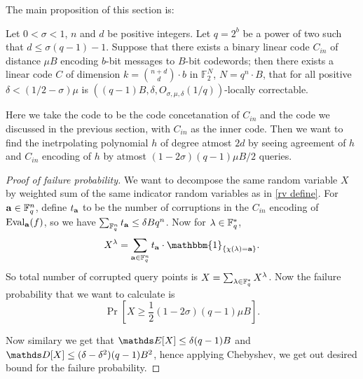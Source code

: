 The main proposition of this section is:

\begin{greybox}
		\begin{proposition}{}{}
			Let $0<\sigma < 1$, $n$ and $d$ be positive integers. Let $q = 2^b$ be a power of two such that $d \leq \sigma(q-1) - 1$. Suppose that there exists a binary linear code $C_{in}$ of distance $\mu B$ encoding $b$-bit messages to $B$-bit codewords; then there exists a linear code $C$ of dimension $k = \binom{n+d}{d} \cdot b$ in $\mathbb{F}_2^N$, $N = q^n \cdot B$, that for all positive $\delta < (1/2 - \sigma)\mu$ is $((q-1)B, \delta, O_{\sigma, \mu, \delta}(1/q))$-locally correctable.
		\end{proposition}
		
\end{greybox}

Here we take the code to be the code concetanation of $C_{in}$ and the code we discussed in the previous section, with $C_{in}$ as the inner code. Then we want to find the inetrpolating polynomial $h$ of degree atmost $2d$ by seeing agreement of $h$ and $C_{in}$ encoding of $h$ by atmost $(1-2\sigma)(q-1)\mu B/2$ queries.

\begin{proof}[Proof of failure probability]
	We want to decompose the same random variable $X$ by weighted sum of the same indicator random variables as in \ref{rv define}. For $\mathbf{a}\in\mathbb{F}_{q}^n$, define $t_{\mathbf{a}}$ to be the number of corruptions in the $C_{in}$ encoding of $\mathrm{Eval}_{\mathbf{a}}(f)$, so we have $\sum_{\mathbb{F}_{q}^n}t_{\mathbf{a}} \leq \delta B q^n$. Now for $\lambda\in\mathbb{F}_{q}^*$,
	\[
	X^{\lambda} = \sum_{\bfa\in\bbf_{q}^n}t_{\bfa}\cdot\mathbbm{1}_{\{\chi(\lambda) = \bfa\}}.
	\]
	So total number of corrupted query points is $	X = \sum_{\lambda\in\mathbb{F}_{q}^*}X^{\lambda}$. Now the failure probability that we want to calculate is 
	\[
	\Pr\left[X\geq \frac{1}{2}(1-2\sigma)(q-1)\mu B\right].
	\]
	
	Now similary we get that $\E[X]\leq \delta(q-1)B$ and $\D[X]\leq (\delta - \delta^2)(q-1)B^2$, hence applying Chebyshev, we get out desired bound for the failure probability.
\end{proof}






